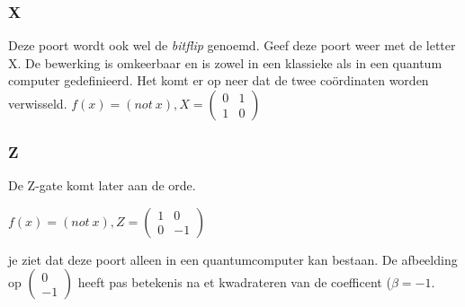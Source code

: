\documentclass[../../main.tex]{subfiles}
\begin{document}
\subsubsection*{\easy X}
Deze poort wordt ook wel de \textit{bitflip} genoemd. Geef deze poort weer met de letter X.
De bewerking is omkeerbaar en is zowel in een klassieke als in een quantum computer gedefinieerd. Het komt er op neer dat de twee co\"ordinaten worden verwisseld.
$f(x)=(not~x), 
X=\begin{pmatrix}
0&1\\
1&0
\end{pmatrix}
$




\subsubsection*{\fun Z}
De Z-gate komt later aan de orde. 


$f(x)=(not~x), Z=\begin{pmatrix}
1&0\\
0&-1
\end{pmatrix}
$


je ziet dat deze poort alleen in een quantumcomputer kan bestaan. De afbeelding op $\begin{pmatrix}
0\\
-1
\end{pmatrix}
$
heeft pas betekenis na et kwadrateren van de coefficent ($\beta=-1$.
\end{document}
